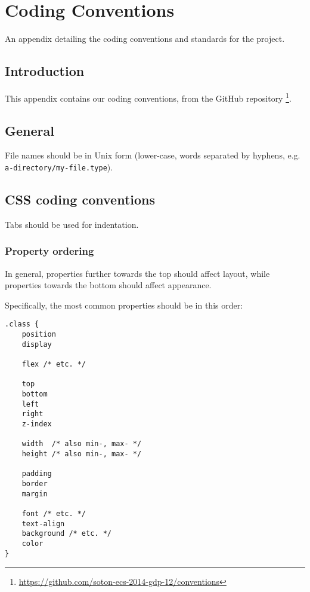 \chapter{Coding Conventions} \label{App:Coding Conventions}

\begin{preamble}
	An appendix detailing the coding conventions and standards for the project.
\end{preamble}

\section{Introduction}

This appendix contains our coding conventions, from the GitHub repository
\footnote{\url{https://github.com/soton-ecs-2014-gdp-12/conventions}}.

\section{General}

File names should be in Unix form (lower-case, words separated by
hyphens, e.g. \texttt{a-directory/my-file.type}).

\section{CSS coding conventions}

Tabs should be used for indentation.

\subsection{Property ordering}

In general, properties further towards the top should affect layout,
while properties towards the bottom should affect appearance.

Specifically, the most common properties should be in this order:

\begin{lstlisting}
.class {
	position
	display

	flex /* etc. */

	top
	bottom
	left
	right
	z-index

	width  /* also min-, max- */
	height /* also min-, max- */

	padding
	border
	margin

	font /* etc. */
	text-align
	background /* etc. */
	color
}
\end{lstlisting}

